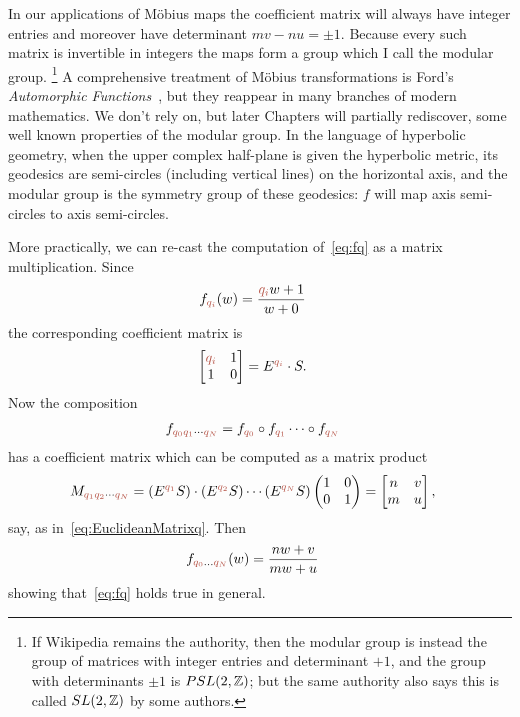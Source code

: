 In our applications of M\"obius maps the coefficient matrix will always have integer entries and moreover have determinant $mv-nu=\pm 1$. Because every such matrix is invertible in integers the maps form a group which I call the modular group.%
\footnote{If Wikipedia remains the authority, then the modular group is instead the group of matrices with integer entries and determinant $+1$, and the group with determinants $\pm 1$ is  $PSL(2,\mathbb{Z})$; but the same authority also says this is called $SL(2,\mathbb{Z})$ by some authors.}
A comprehensive treatment of M\"obius transformations is Ford's \textit{Automorphic Functions}~\cite{fordAutomorphicFunctions1951}, but they reappear in many branches of modern mathematics. We don't rely on, but later Chapters will partially rediscover, some well known properties of the modular group. In the language of hyperbolic geometry, when the upper complex half-plane is given the hyperbolic metric, its geodesics are semi-circles (including vertical lines) on the horizontal axis, and the modular group is the symmetry group of these geodesics: $f$ will map axis semi-circles to axis semi-circles. 

More practically, we can re-cast the computation of~\ref{eq:fq} as a matrix multiplication. Since 
\begin{align}
		f_\jqix{i}(\wC)  &=\frac{\jqix{i} \wC+1}{\wC+0}
\end{align}
the corresponding coefficient matrix is 
\begin{align}
	\begin{bmatrix}
	\jqix{i} & 1 \\ 1 & 0	\end{bmatrix}
	 &=E^{\jqix{i}}\cdot S.
\end{align}
Now the composition
\begin{align}
	f_{\jqix{0}\jqix{1}\cdots\jqix{N}} &= 	f_{\jqix{0}}\circ f_{\jqix{1}}\cdots\circ f_{\jqix{N}}
\end{align}
has a coefficient matrix which can be computed as a matrix product
\begin{align}
	M_{\jqn{q_1}\jqn{q_2}\cdots\jqn{q_N}}
  &= 
	(E^{\jqn{q_1}} S )\cdot( E^{\jqn{q_2}} S ) \cdots  (E^{\jqn{q_N}} S)  \begin{pmatrix} 1&0  \\ 0&1 \end{pmatrix}	=	\begin{bmatrix} n & v \\ m & u \end{bmatrix}, 
\end{align}
say, as in~\eqref{eq:EuclideanMatrixq}. Then 
\begin{align}
	f_{\jqix{0}\ldots \jqix{N}}(\wC) &= \frac{n\wC+v}{m\wC+u} 
\end{align}
showing that~\eqref{eq:fq} holds true in general. 



